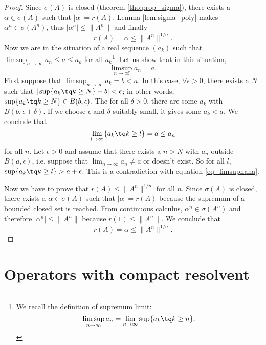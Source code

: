 \begin{proof}
	Since $\sigma(A)$ is closed (theorem \ref{tho:prop_sigma}), there exists a $\alpha\in\sigma(A)$ such that $|\alpha|=r(A)$. Lemma \ref{lem:sigma_poly} makes $\alpha^n\in\sigma(A^n)$, thus $|\alpha^n|\leq\|A^n\|$ and finally
	\begin{equation}
	  r(A)=\alpha\leq\|A^n\|^{1/n}.
	\end{equation}
	Now we are in the situation of a real sequence $(a_k)$ such that $\limsup_{n\to\infty} a_n\leq a \leq a_k$ for all $a_k$\footnote{We recall the definition of supremum limit:
	\[ 
	  \limsup_{n\to\infty} a_n=\lim_{n\to\infty}\sup\{ a_k\tq k\geq n \}.
	\]
	}.		%
	Let us show that in this situation, 
	\begin{equation} \label{eq_limsupnana}
	\limsup_{n\to\infty} a_n=a.
	\end{equation}
	 First suppose that $\limsup_{n\to\infty}a_k=b<a$.  In this case, $\forall \epsilon>0$, there exists a $N$ such that
	$  | \sup\{ a_k\tq k\geq N \}-b |<\epsilon$;
	in other words, $\sup\{ a_k\tq k\geq N \}\in B(b,\epsilon)$. The for all $\delta>0$, there are some $a_k$ with $B(b,\epsilon+\delta)$. If we choose $\epsilon$ and $\delta$ suitably small, it gives some $a_k<a$. We conclude that
	\[ 
	  \lim_{l\to\infty}\{ a_k\tq k\geq l \}=a\leq a_n
	\]
	for all $n$. Let $\epsilon>0$ and assume that there exists a $n>N$ with $a_n$ outside $B(a,\epsilon)$, i.e. suppose that $\lim_{n\to\infty}a_n\neq a$ or doesn't exist. So for all $l$, $\sup\{ a_k\tq k\geq l \}>a+\epsilon$. This is a contradiction with equation \eqref{eq_limsupnana}.

	Now we have to prove that $r(A)\leq \| A^n \|^{1/n}$ for all $n$. Since $\sigma(A)$ is closed, there exists a $\alpha\in\sigma(A)$ such that $| \alpha |=r(A)$ because the supremum of a bounded closed set is reached\angl. From continuous calculus,  $\alpha^n\in\sigma(A^n)$ and therefore $| \alpha^n |\leq\| A^n \|$ because $r(1)\leq \| A^n \|$. We conclude that 
	\[ 
	  r(A)=\alpha\leq\| A^n \|^{1/n}.
	\]
\end{proof}

\section{Operators with compact resolvent}

